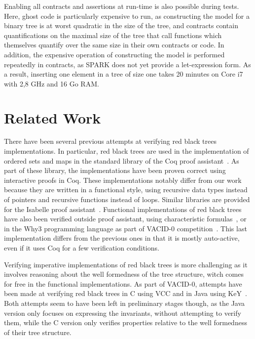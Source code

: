 \documentclass[11pt,a4paper]{article}
\begin{document}
Enabling all contracts and assertions at run-time is also possible during
tests. Here, ghost code is particularly expensive to run, as constructing the
model for a binary tree is at worst quadratic in the size of the tree, and
contracts contain quantifications on the maximal size of the tree that call
functions which themselves quantify over the same size in their own contracts
or code. In addition, the expensive operation of constructing the model is
performed repeatedly in contracts, as SPARK does not yet provide a
let-expression form.  As a result, inserting one element in a tree of size one
takes 20 minutes on Core i7 with 2,8 GHz and 16 Go RAM.

\section{Related Work}
\label{related-work}
There have been several previous attempts at verifying red black trees implementations. In particular, red black trees are
used in the implementation of ordered sets and maps in the standard library of the Coq proof
assistant~\cite{filliatre2004functors,appel2011efficient}. As part of these library, the implementations have been proven
correct using interactive proofs in Coq. These implementations notably differ from our work because they are written in
a functional style, using recursive data types instead of pointers and recursive functions instead of loops. Similar
libraries are provided for the Isabelle proof assistant~\cite{lammich2010isabelle}. Functional implementations of
red black trees have also been verified outside proof assistant, using characteristic formulas~\cite{chargueraud2010program},
or in the Why3 programming language as part of VACID-0 competition~\cite{leino2010vacid}. This last implementation differs from
the previous ones in that it is mostly auto-active, even if it uses Coq for a few verification conditions.

Verifying imperative implementations of red black trees is more challenging as it involves reasoning about the well formedness
of the tree structure, witch comes for free in the functional implementations. As part of VACID-0, attempts have been made at
verifying red black trees in C using VCC and in Java using KeY~\cite{bruns2011specification}.
Both attempts seem to have been left in preliminary stages
though, as the Java version only focuses on expressing the invariants, without attempting to verify them, while the C
version only verifies properties relative to the well formedness of their tree structure.
\end{document}
